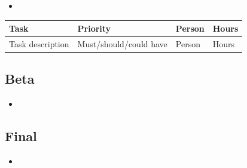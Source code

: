 \documentclass[12pt,notitlepage]{article}
\begin{document}
\begin{itemize}
\item
\end{itemize}

\begin{tabu}{lXXl}
\toprule
Task & Priority & Person & Hours \\
\midrule
Task description & Must/should/could have & Person & Hours \\
\bottomrule
\end{tabu}

\subsection{Beta}

\begin{itemize}
\item
\end{itemize}

\subsection{Final}
\begin{itemize}
\item
\end{itemize}
\end{document}
